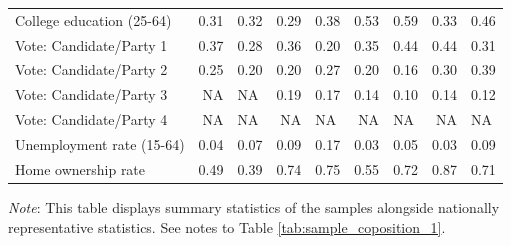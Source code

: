 \begin{table}[h!]
{{\begin{tabular}[t]{lrlrlrlrl}
    \addlinespace
    College education (25-64) & 0.31 & 0.32 & 0.29 & 0.38 & 0.53 & 0.59 & 0.33 & 0.46\\
    \addlinespace
    Vote: Candidate/Party 1 & 0.37 & 0.28 & 0.36 & 0.20 & 0.35 & 0.44 & 0.44 & 0.31\\
    Vote: Candidate/Party 2 & 0.25 & 0.20 & 0.20 & 0.27 & 0.20 & 0.16 & 0.30 & 0.39\\
    Vote: Candidate/Party 3 & NA & NA & 0.19 & 0.17 & 0.14 & 0.10 & 0.14 & 0.12\\
    Vote: Candidate/Party 4 & NA & NA & NA & NA & NA & NA & NA & NA\\
    \addlinespace
    Unemployment rate (15-64) & 0.04 & 0.07 & 0.09 & 0.17 & 0.03 & 0.05 & 0.03 & 0.09\\
    \addlinespace
    Home ownership rate & 0.49 & 0.39 & 0.74 & 0.75 & 0.55 & 0.72 & 0.87 & 0.71\\
    \bottomrule
    \end{tabular}
            }
        } \label{tab:sample_composition_2}
        {\footnotesize \textit{Note}: This table displays summary statistics of the samples alongside nationally representative statistics. See notes to Table \ref{tab:sample_coposition_1}.}
    \end{table}
    
